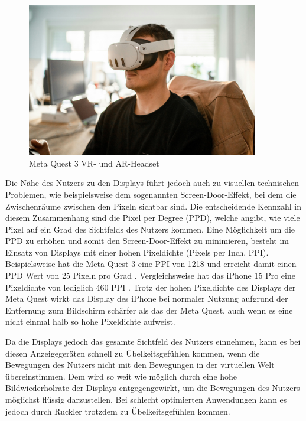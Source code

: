     \begin{figure}[H]
      \centering
      \includegraphics[width=0.9\textwidth]{images/quest3_example.jpg}
      \caption{Meta Quest 3 VR- und AR-Headset}
      \label{fig:oculus-quest-3}
    \end{figure}

    Die Nähe des Nutzers zu den Displays führt jedoch auch zu visuellen technischen Problemen, wie beispielsweise dem sogenannten Screen-Door-Effekt, bei dem die Zwischenräume zwischen den Pixeln sichtbar sind.
    Die entscheidende Kennzahl in diesem Zusammenhang sind die Pixel per Degree (PPD), welche angibt, wie viele Pixel auf ein Grad des Sichtfelds des Nutzers kommen.
    Eine Möglichkeit um die PPD zu erhöhen und somit den Screen-Door-Effekt zu minimieren, besteht im Einsatz von Displays mit einer hohen Pixeldichte (Pixels per Inch, PPI).
    Beispielsweise hat die Meta Quest 3 eine PPI von 1218 und erreicht damit einen PPD Wert von 25 Pixeln pro Grad \autocite[]{meta-quest-3}.
    Vergleichsweise hat das iPhone 15 Pro eine Pixeldichte von lediglich 460 PPI \autocite[]{iPhone15Pro-datenblatt}.
    Trotz der hohen Pixeldichte des Displays der Meta Quest wirkt das Display des iPhone bei normaler Nutzung aufgrund der Entfernung zum Bildschirm schärfer als das der Meta Quest, auch wenn es eine nicht einmal halb so hohe Pixeldichte aufweist.

    Da die Displays jedoch das gesamte Sichtfeld des Nutzers einnehmen, kann es bei diesen Anzeigegeräten schnell zu Übelkeitsgefühlen kommen, wenn die Bewegungen des Nutzers nicht mit den Bewegungen in der virtuellen Welt übereinstimmen.
    Dem wird so weit wie möglich durch eine hohe Bildwiederholrate der Displays entgegengewirkt, um die Bewegungen des Nutzers möglichst flüssig darzustellen.
    Bei schlecht optimierten Anwendungen kann es jedoch durch Ruckler trotzdem zu Übelkeitsgefühlen kommen.

